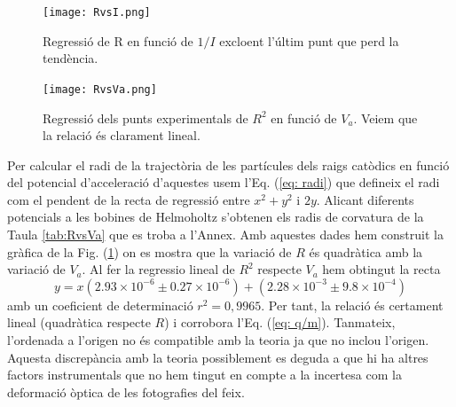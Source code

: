 \documentclass[11pt]{article}
\numberwithin{equation}{section}
\numberwithin{figure}{section}
\numberwithin{table}{section}
\begin{document}
\begin{figure}[h]
    \centering
    \begin{minipage}{0.45\textwidth}
        \centering
        \texttt{[image: RvsI.png]}
        \caption{Regressió de R en funció de $1/I$ excloent l'últim punt que perd la tendència.}
        \label{fig: RvsI}
    \end{minipage}
    \hfill
    \begin{minipage}{0.45\textwidth} 
        \centering
        \texttt{[image: RvsVa.png]}
        \caption{Regressió dels punts experimentals de $R^2$ en funció de $V_a$. Veiem que la relació és clarament lineal.}
        \label{fig: RvsVa}
    \end{minipage}
\end{figure}
Per calcular el radi de la trajectòria de les partícules dels raigs catòdics en funció del potencial d'acceleració d'aquestes usem l'Eq. (\ref{eq: radi}) que defineix el radi com el pendent de la recta de regressió entre $x^2+y^2$ i $2y$. Alicant diferents potencials a les bobines de Helmoholtz s'obtenen els radis de corvatura de la Taula \ref{tab:RvsVa} que es troba a l'Annex. Amb aquestes dades hem construit la gràfica de la Fig. (\ref{fig: RvsVa}) on es mostra que la variació de $R$ és quadràtica amb la variació de $V_a$. Al fer la regressio lineal de $R^2$ respecte $V_a$ hem obtingut la recta
\begin{equation}
    y=x(2.93\times10^{-6}\pm0.27\times10^{-6})+(2.28\times 10^{-3}\pm9.8\times10^{-4})
\end{equation}  
amb un coeficient de determinació $r^2=0,9965$. Per tant, la relació és certament lineal (quadràtica respecte $R$) i corrobora l'Eq. (\ref{eq: q/m}). Tanmateix, l'ordenada a l'origen no és compatible amb la teoria ja que no inclou l'origen. Aquesta discrepància amb la teoria possiblement es deguda a que hi ha altres factors instrumentals que no hem tingut en compte a la incertesa com la deformació òptica de les fotografies del feix.
\end{document}
